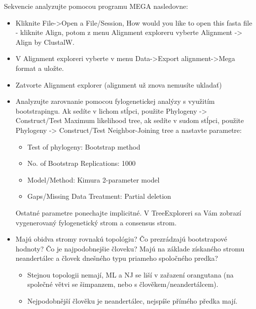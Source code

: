 \documentclass[11pt]{article}
\begin{document}
Sekvencie analyzujte pomocou programu MEGA nasledovne:
\begin{itemize}
\item Kliknite File->Open a File/Session, How would you like to open this
fasta file - kliknite Align, potom z menu Alignment exploreru
vyberte Alignment -> Align by ClustalW.
\item V Alignment exploreri vyberte v menu Data->Export alignment->Mega
format a uložte.
\item Zatvorte Alignment explorer (alignment už znova nemusíte ukladať)
\item Analyzujte zarovnanie pomocou fylogenetickej analýzy s využitím
bootstrapingu. Ak sedíte v lichom stĺpci, použite Phylogeny ->
Construct/Test Maximum likelihood tree, ak sedíte v sudom stĺpci,
použite Phylogeny -> Construct/Test Neighbor-Joining tree a
nastavte parametre:

\begin{itemize}
\item Test of phylogeny: Bootstrap method
\item No. of Bootstrap Replications: 1000
\item Model/Method: Kimura 2-parameter model
\item Gaps/Missing Data Treatment: Partial deletion
\end{itemize}

Ostatné parametre ponechajte implicitné. V TreeExploreri sa Vám
zobrazí vygenerovaný fylogenetický strom a consensus strom.

\item Majú obidva stromy rovnakú topológiu? Čo prezrádzajú bootstrapové hodnoty? Čo
je najpodobnejšie človeku? Majú na základe získaného stromu neandertálec a
človek dnešného typu priameho spoločného predka?
\begin{itemize}
\item Stejnou topologii nemají, ML a NJ se liší v zařazení orangutana (na společné
větvi se šimpanzem, nebo s člověkem/neandertálcem).
\item Nejpodobnější člověku je neandertálec, nejspíše přímého předka mají.
\end{itemize}
\end{itemize}
\end{document}
